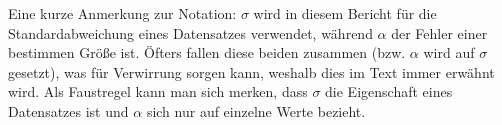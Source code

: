 %

Eine kurze Anmerkung zur Notation: \( \sigma \) wird in diesem Bericht für die Standardabweichung eines Datensatzes verwendet, während \( \alpha \) der Fehler einer bestimmen Größe ist. Öfters fallen diese beiden zusammen (bzw. \( \alpha \) wird auf \( \sigma \) gesetzt), was für Verwirrung sorgen kann, weshalb dies im Text immer erwähnt wird.
Als Faustregel kann man sich merken, dass \( \sigma \) die Eigenschaft eines Datensatzes ist und \( \alpha \) sich nur auf einzelne Werte bezieht.